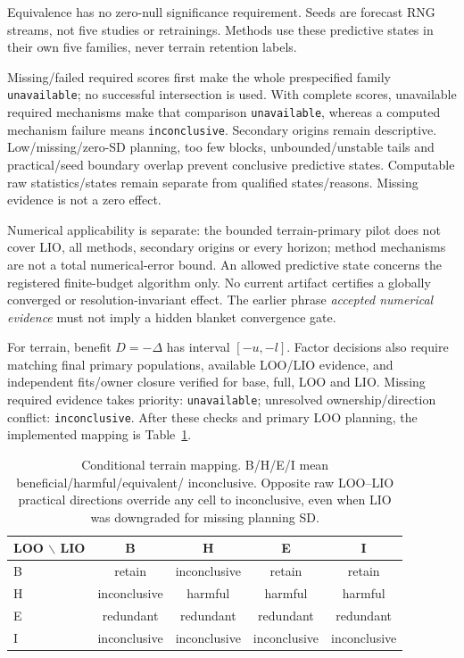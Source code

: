 Equivalence has no zero-null significance requirement. Seeds are forecast
RNG streams, not five studies or retrainings. Methods use these predictive
states in their own five families, never terrain retention labels.

Missing/failed required scores first make the whole prespecified family
\texttt{unavailable}; no successful intersection is used. With complete
scores, unavailable required mechanisms make that comparison
\texttt{unavailable}, whereas a computed mechanism failure means
\texttt{inconclusive}. Secondary origins remain descriptive.
Low/missing/zero-SD planning, too few blocks, unbounded/unstable tails
and practical/seed boundary overlap prevent conclusive predictive states.
Computable raw statistics/states remain separate from qualified states/reasons.
Missing evidence is not a zero effect.

Numerical applicability is separate: the bounded terrain-primary pilot
does not cover LIO, all methods, secondary origins or every horizon;
method mechanisms are not a total numerical-error bound. An allowed predictive
state concerns the registered finite-budget algorithm only. No current artifact
certifies a globally converged or resolution-invariant effect. The earlier
phrase \emph{accepted numerical evidence} must not imply a hidden blanket
convergence gate.

For terrain, benefit \(D=-\Delta\) has interval \([-u,-l]\).
Factor decisions also require matching final primary populations, available
LOO/LIO evidence, and independent fits/owner closure verified for base,
full, LOO and LIO. Missing required evidence takes priority:
\texttt{unavailable}; unresolved ownership/direction conflict:
\texttt{inconclusive}. After these checks and primary LOO planning,
the implemented mapping is Table~\ref{tab:loo-lio-states}.

\begin{table}[htbp]
\centering\small
\caption{Conditional terrain mapping. B/H/E/I mean beneficial/harmful/equivalent/
inconclusive. Opposite raw LOO--LIO practical directions override any cell
to inconclusive, even when LIO was downgraded for missing planning SD.}
\label{tab:loo-lio-states}\hypertarget{tab:loo-lio-states}{}
\begin{tabular}{lcccc}
\toprule
LOO \(\backslash\) LIO & B & H & E & I\\
\midrule
B & retain & inconclusive & retain & retain\\
H & inconclusive & harmful & harmful & harmful\\
E & redundant & redundant & redundant & redundant\\
I & inconclusive & inconclusive & inconclusive & inconclusive\\
\bottomrule
\end{tabular}
\end{table}

